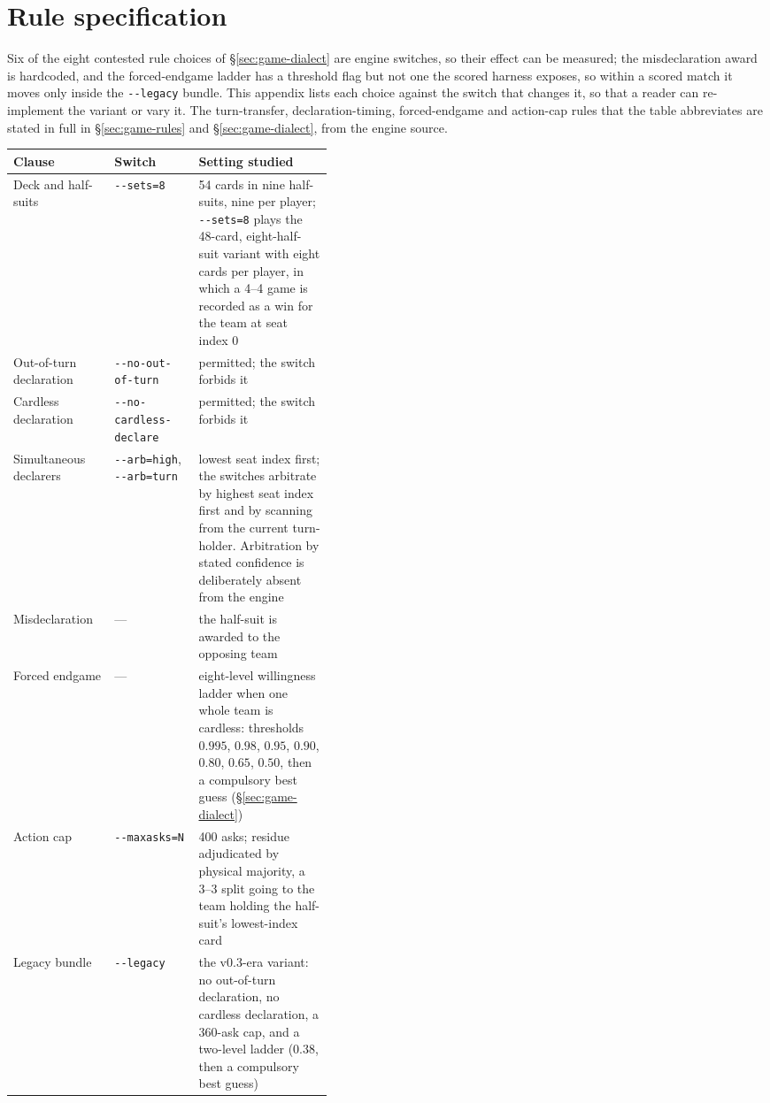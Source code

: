 \section{Rule specification}
\label{app:dialect}

Six of the eight contested rule choices of \S\ref{sec:game-dialect} are engine switches, so their
effect can be measured; the misdeclaration award is hardcoded, and the forced-endgame ladder has a
threshold flag but not one the scored harness exposes, so within a scored match it moves only inside
the \texttt{-{}-legacy} bundle. This appendix lists each choice against the switch that changes it,
so that a reader can re-implement the variant or vary it. The turn-transfer, declaration-timing,
forced-endgame and action-cap rules that the table abbreviates are stated in full in
\S\ref{sec:game-rules} and \S\ref{sec:game-dialect}, from the engine source.

\begin{center}\tabfont
\begin{tabular}{llp{0.42\linewidth}}
\toprule
Clause & Switch & Setting studied \\
\midrule
Deck and half-suits & \texttt{-{}-sets=8} & 54 cards in nine half-suits, nine per player;
\texttt{-{}-sets=8} plays the 48-card, eight-half-suit variant with eight cards per player, in which
a 4--4 game is recorded as a win for the team at seat index 0 \\
Out-of-turn declaration & \texttt{-{}-no-out-of-turn} & permitted; the switch forbids it \\
Cardless declaration & \texttt{-{}-no-cardless-declare} & permitted; the switch forbids it \\
Simultaneous declarers & \texttt{-{}-arb=high}, \texttt{-{}-arb=turn} & lowest seat index first;
the switches arbitrate by highest seat index first and by scanning from the current turn-holder.
Arbitration by stated confidence is deliberately absent from the engine \\
Misdeclaration & --- & the half-suit is awarded to the opposing team \\
Forced endgame & --- & eight-level willingness ladder when one whole team is cardless: thresholds
$0.995$, $0.98$, $0.95$, $0.90$, $0.80$, $0.65$, $0.50$, then a compulsory best guess
(\S\ref{sec:game-dialect}) \\
Action cap & \texttt{-{}-maxasks=N} & 400 asks; residue adjudicated by physical majority, a 3--3
split going to the team holding the half-suit's lowest-index card \\
Legacy bundle & \texttt{-{}-legacy} & the v0.3-era variant: no out-of-turn declaration, no cardless
declaration, a 360-ask cap, and a two-level ladder ($0.38$, then a compulsory best guess) \\
\bottomrule
\end{tabular}
\end{center}


